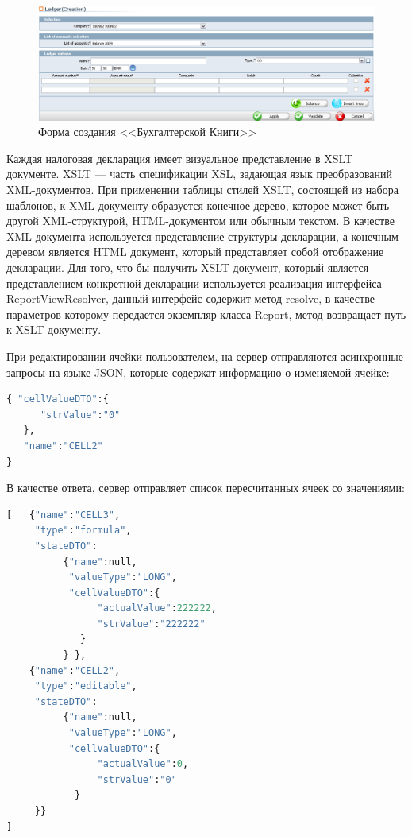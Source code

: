 \documentclass[14pt,a4paper]{reportmod}
\begin{document}
\begin{figure}
  \centering
  \includegraphics[scale=0.43]{pics/scr_ledger_creation}
  \caption{Форма создания <<Бухгалтерской Книги>>}
  \label{pic:ledger_creation}
\end{figure}

Каждая налоговая декларация имеет визуальное представление в XSLT документе. XSLT --- часть спецификации XSL, задающая язык преобразований XML-документов. При применении таблицы стилей XSLT, состоящей из набора шаблонов, к XML-документу образуется конечное дерево, которое может быть другой XML-структурой, HTML-документом или обычным текстом. В качестве XML документа используется представление структуры декларации, а конечным деревом является HTML документ, который представляет собой отображение декларации. Для того, что бы получить XSLT документ, который является представлением конкретной декларации используется реализация интерфейса ReportViewResolver, данный интерфейс содержит метод resolve, в качестве параметров которому передается экземпляр класса Report, метод возвращает путь к XSLT документу.

При редактировании ячейки пользователем, на сервер отправляются асинхронные запросы на языке JSON, которые содержат информацию о изменяемой ячейке:
\begin{lstlisting}[language=Python,basicstyle=\small]
{ "cellValueDTO":{
      "strValue":"0"
   },
   "name":"CELL2"
}
\end{lstlisting}

В качестве ответа, сервер отправляет список пересчитанных ячеек со значениями:
\begin{lstlisting}[language=Python,basicstyle=\small]
[   {"name":"CELL3",
     "type":"formula",
     "stateDTO":
          {"name":null,
           "valueType":"LONG",
           "cellValueDTO":{
                "actualValue":222222,
                "strValue":"222222"
             }
          } },
    {"name":"CELL2",
     "type":"editable",
     "stateDTO":
          {"name":null,
           "valueType":"LONG",
           "cellValueDTO":{
                "actualValue":0,
                "strValue":"0"
            }
     }}
]
\end{lstlisting}
\end{document}
